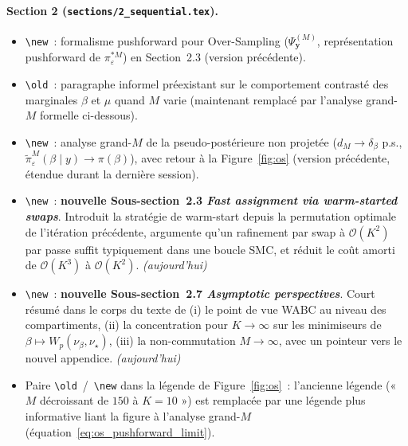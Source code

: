\documentclass[11pt]{article}
\begin{document}
\paragraph{Section 2 (\texttt{sections/2\_sequential.tex}).}
\begin{itemize}[nosep]
    \item \texttt{\textbackslash new}~: formalisme pushforward pour Over-Sampling
    ($\Psi_{\mathbf{y}}^{(M)}$, représentation pushforward de $\pi_\varepsilon^{*M}$) en
    Section~2.3 (version précédente).
    \item \texttt{\textbackslash old}~: paragraphe informel préexistant sur le comportement
    contrasté des marginales $\beta$ et $\mu$ quand $M$ varie (maintenant remplacé par
    l'analyse grand-$M$ formelle ci-dessous).
    \item \texttt{\textbackslash new}~: analyse grand-$M$ de la pseudo-postérieure non projetée
    ($d_M \to \delta_\beta$ p.s., $\tilde\pi_\varepsilon^M(\beta\mid y) \to \pi(\beta)$), avec
    retour à la Figure~\ref{fig:os} (version précédente, étendue durant la dernière session).
    \item \texttt{\textbackslash new}~: \textbf{nouvelle Sous-section~2.3 \emph{Fast assignment
    via warm-started swaps}}. Introduit la stratégie de warm-start depuis la permutation optimale
    de l'itération précédente, argumente qu'un rafinement par swap à $\mathcal{O}(K^2)$ par
    passe suffit typiquement dans une boucle SMC, et réduit le coût amorti de
    $\mathcal{O}(K^3)$ à $\mathcal{O}(K^2)$. \textit{(aujourd'hui)}
    \item \texttt{\textbackslash new}~: \textbf{nouvelle Sous-section~2.7 \emph{Asymptotic
    perspectives}}. Court résumé dans le corps du texte de (i) le point de vue WABC au niveau des
    compartiments, (ii) la concentration pour $K\to\infty$ sur les minimiseurs de
    $\beta \mapsto W_p(\nu_\beta,\nu_\star)$, (iii) la non-commutation $M\to\infty$, avec un
    pointeur vers le nouvel appendice. \textit{(aujourd'hui)}
    \item Paire \texttt{\textbackslash old}~/~\texttt{\textbackslash new} dans la légende de
    Figure~\ref{fig:os}~: l'ancienne légende (« $M$ décroissant de $150$ à $K=10$ ») est
    remplacée par une légende plus informative liant la figure à l'analyse grand-$M$
    (équation~\eqref{eq:os_pushforward_limit}).
\end{itemize}
\end{document}
